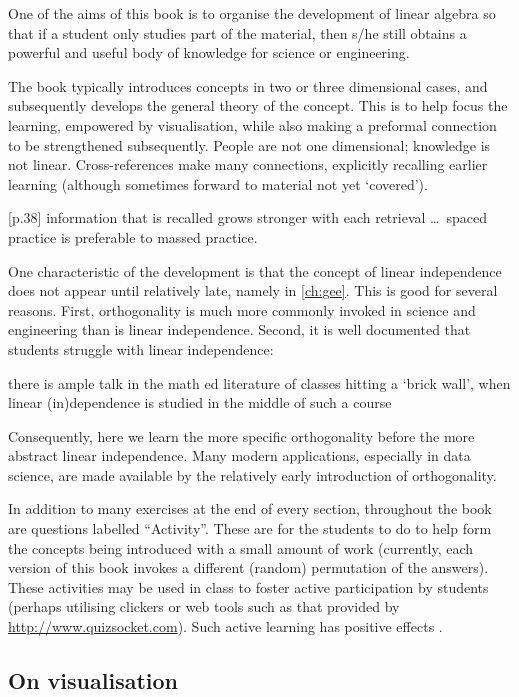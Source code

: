One of the aims of this book is to organise the development of linear algebra so that if a student only studies part of the material, then s/he still obtains a powerful and useful body of knowledge for science or engineering.

The book typically introduces concepts in two or three dimensional cases, and subsequently develops the general theory of the concept.  
This is to help focus the learning, empowered by visualisation, while also making a preformal connection to be strengthened subsequently.
People are not one dimensional; knowledge is not linear.
Cross-references make many connections, explicitly recalling earlier learning (although sometimes forward to material not yet `covered').
\begin{quoted}{\cite{Halpern2003} [p.38]}
information that is recalled grows stronger with each retrieval \ldots\ spaced practice is preferable to massed practice.
\end{quoted}

One characteristic of the development is that the concept of linear independence does not appear until relatively late, namely in \autoref{ch:gee}.
This is good for several reasons.
First, orthogonality is much more commonly invoked in science and engineering than is linear independence.
Second, it is well documented that students struggle with linear independence:
\begin{quoted}{\cite{Uhlig02}}
there is ample talk in the math ed literature of classes hitting a `brick wall', when linear (in)dependence is studied in the middle of such a course
\end{quoted}
Consequently, here we learn the more specific orthogonality before the more abstract linear independence.
Many modern applications, especially in data science, are made available by the relatively early introduction of orthogonality.

In addition to many exercises at the end of every section, throughout the book are questions labelled ``Activity''.
These are for the students to do to help form the concepts being introduced with a small amount of work (currently, each version of this book invokes a different (random) permutation of the answers).
These activities may be used in class to foster active participation by students (perhaps utilising clickers or web tools such as that provided by \url{http://www.quizsocket.com}).
Such active learning has positive effects \cite[]{ED498555}.




\subsection*{On visualisation}

